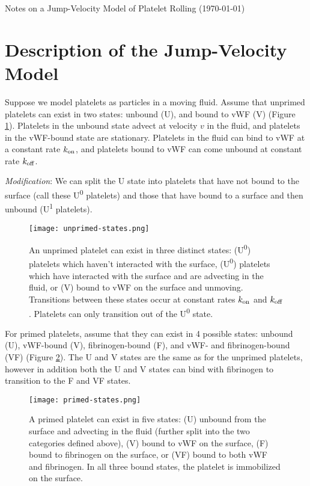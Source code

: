 \documentclass{article}
\newcommand{\tn}{\textnormal}
\begin{document}
\pagestyle{plain}

\begin{center}
  {\Large Notes on a Jump-Velocity Model of Platelet Rolling (\today)}
\end{center}

\section{Description of the Jump-Velocity Model}
\label{sec:jump-vel}

Suppose we model platelets as particles in a moving fluid. Assume that
unprimed platelets can exist in two states: unbound (U), and bound to
vWF (V) (Figure \ref{fig:unprimed-states}). Platelets in the unbound
state advect at velocity $v$ in the fluid, and platelets in the
vWF-bound state are stationary. Platelets in the fluid can bind to vWF
at a constant rate $k_\tn{on}$, and platelets bound to vWF can come
unbound at constant rate $k_\tn{off}$.

\emph{Modification}: We can split the U state into platelets that have
not bound to the surface (call these U\textsuperscript{0} platelets)
and those that have bound to a surface and then unbound
(U\textsuperscript{1} platelets).

\begin{figure}[h]
  \centering
  \texttt{[image: unprimed-states.png]}
  \caption[Possible states of unprimed platelets]{An unprimed platelet
    can exist in three distinct states: (U\textsuperscript{0})
    platelets which haven't interacted with the surface,
    (U\textsuperscript{0}) platelets which have interacted with the
    surface and are advecting in the fluid, or (V) bound to vWF on the
    surface and unmoving. Transitions between these states occur at
    constant rates $k_\tn{on}$ and $k_\tn{off}$. Platelets can only
    transition out of the U\textsuperscript{0} state.}
  \label{fig:unprimed-states}
\end{figure}

For primed platelets, assume that they can exist in 4 possible states:
unbound (U), vWF-bound (V), fibrinogen-bound (F), and vWF- and
fibrinogen-bound (VF) (Figure \ref{fig:primed-states}). The U and V
states are the same as for the unprimed platelets, however in addition
both the U and V states can bind with fibrinogen to transition to the
F and VF states. 

\begin{figure}[h]
  \centering
  \texttt{[image: primed-states.png]}
  \caption[Possible states of primed platelets]{A primed platelet can
    exist in five states: (U) unbound from the surface and advecting
    in the fluid (further split into the two categories defined
    above), (V) bound to vWF on the surface, (F) bound to fibrinogen
    on the surface, or (VF) bound to both vWF and fibrinogen. In all
    three bound states, the platelet is immobilized on the surface.}
  \label{fig:primed-states}
\end{figure}
\end{document}
